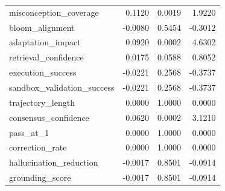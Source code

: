 \begin{tabular}{lrrr}
misconception\_coverage & 0.1120 & 0.0019 & 1.9220 \\
bloom\_alignment & -0.0080 & 0.5454 & -0.3012 \\
adaptation\_impact & 0.0920 & 0.0002 & 4.6302 \\
retrieval\_confidence & 0.0175 & 0.0588 & 0.8052 \\
execution\_success & -0.0221 & 0.2568 & -0.3737 \\
sandbox\_validation\_success & -0.0221 & 0.2568 & -0.3737 \\
trajectory\_length & 0.0000 & 1.0000 & 0.0000 \\
consensus\_confidence & 0.0620 & 0.0002 & 3.1210 \\
pass\_at\_1 & 0.0000 & 1.0000 & 0.0000 \\
correction\_rate & 0.0000 & 1.0000 & 0.0000 \\
hallucination\_reduction & -0.0017 & 0.8501 & -0.0914 \\
grounding\_score & -0.0017 & 0.8501 & -0.0914 \\
\bottomrule
\end{tabular}
